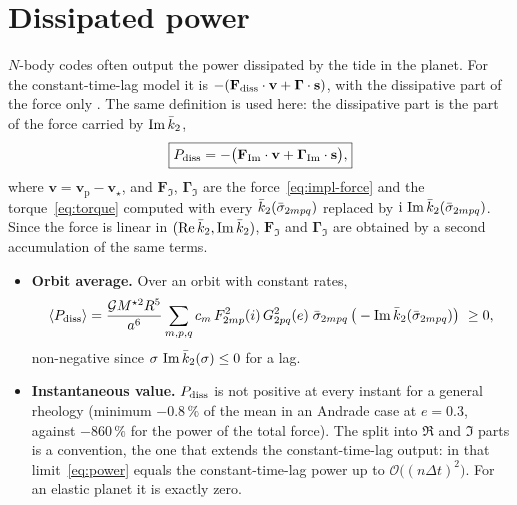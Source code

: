 \section{Dissipated power}\label{sec:power}
$N$-body codes often output the power dissipated by the tide in the planet. For the constant-time-lag model it is $-(\mathbf F_{\rm diss}\cdot\mathbf v+\boldsymbol\Gamma\cdot\mathbf s)$, with the dissipative part of the force only \citep{Bolmont2015}. The same definition is used here: the dissipative part is the part of the force carried by $\Im\kb_2$,
\begin{equation}
  \boxed{P_{\rm diss}=-\big(\mathbf F_{\Im}\cdot\mathbf v+\boldsymbol\Gamma_{\Im}\cdot\mathbf s\big),} \label{eq:power}
\end{equation}
where $\mathbf v=\mathbf v_{\mathrm p}-\mathbf v_\star$, and $\mathbf F_{\Im}$, $\boldsymbol\Gamma_{\Im}$ are the force~\eqref{eq:impl-force} and the torque~\eqref{eq:torque} computed with every $\kb_2(\bar\sigma_{2mpq})$ replaced by $\I\,\Im\kb_2(\bar\sigma_{2mpq})$. Since the force is linear in $(\Re\kb_2,\Im\kb_2)$, $\mathbf F_{\Im}$ and $\boldsymbol\Gamma_{\Im}$ are obtained by a second accumulation of the same terms.
\begin{itemize}
  \item \textbf{Orbit average.} Over an orbit with constant rates,
  \begin{equation}
    \langle P_{\rm diss}\rangle=\frac{\G M^{\star2}R^5}{a^6}\sum_{m,p,q}c_m\,F_{2mp}^2(i)\,G_{2pq}^2(e)\;\bar\sigma_{2mpq}\,\big(-\Im\kb_2(\bar\sigma_{2mpq})\big)\ \ge0, \label{eq:power-mean}
  \end{equation}
  non-negative since $\sigma\,\Im\kb_2(\sigma)\le0$ for a lag.
  \item \textbf{Instantaneous value.} $P_{\rm diss}$ is not positive at every instant for a general rheology (minimum $-0.8\,\%$ of the mean in an Andrade case at $e=0.3$, against $-860\,\%$ for the power of the total force). The split into $\Re$ and $\Im$ parts is a convention, the one that extends the constant-time-lag output: in that limit~\eqref{eq:power} equals the constant-time-lag power up to $\mathcal O\big((n\Delta t)^2\big)$. For an elastic planet it is exactly zero.
\end{itemize}

